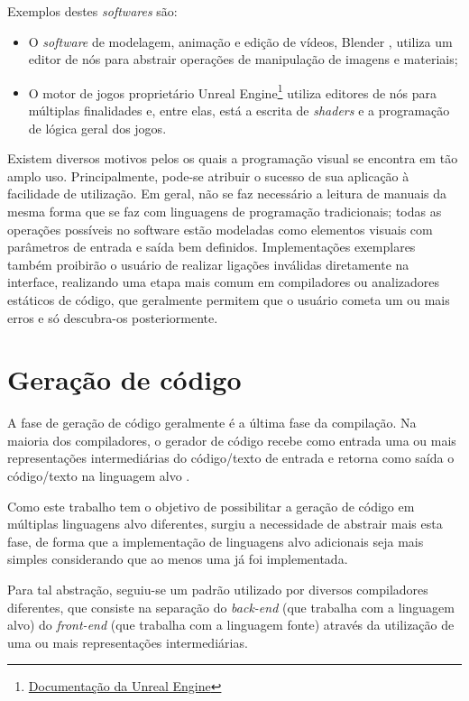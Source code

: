 \documentclass[
	12pt,				%
	openright,			%
	oneside,			%
	a4paper,			%
	main=brazil,
	english,			%
	]{ufsj-abntex2}
\begin{document}
Exemplos destes \textit{softwares} são:

\begin{itemize}
    \item O \textit{software} de modelagem, animação e edição de vídeos, Blender \cite{blender}, utiliza um editor de nós para abstrair operações de manipulação de imagens e materiais;

    \item O motor de jogos proprietário Unreal Engine\footnote{\href{https://www.unrealengine.com/}{Documentação da Unreal Engine}} utiliza editores de nós para múltiplas finalidades e, entre elas, está a escrita de \textit{shaders} e a programação de lógica geral dos jogos.
\end{itemize}

Existem diversos motivos pelos os quais a programação visual se encontra em tão amplo uso. Principalmente, pode-se atribuir o sucesso de sua aplicação à facilidade de utilização. Em geral, não se faz necessário a leitura de manuais da mesma forma que se faz com linguagens de programação tradicionais; todas as operações possíveis no software estão modeladas como elementos visuais com parâmetros de entrada e saída bem definidos. Implementações exemplares também proibirão o usuário de realizar ligações inválidas diretamente na interface, realizando uma etapa mais comum em compiladores ou analizadores estáticos de código, que geralmente permitem que o usuário cometa um ou mais erros e só descubra-os posteriormente.

\section{Geração de código}

A fase de geração de código geralmente é a última fase da compilação. Na maioria dos compiladores, o gerador de código recebe como entrada uma ou mais representações intermediárias do código/texto de entrada e retorna como saída o código/texto na linguagem alvo \cite{dragonBook}. 

Como este trabalho tem o objetivo de possibilitar a geração de código em múltiplas linguagens alvo diferentes, surgiu a necessidade de abstrair mais esta fase, de forma que a implementação de linguagens alvo adicionais seja mais simples considerando que ao menos uma já foi implementada.

Para tal abstração, seguiu-se um padrão utilizado por diversos compiladores diferentes, que consiste na separação do \textit{back-end} (que trabalha com a linguagem alvo) do \textit{front-end} (que trabalha com a linguagem fonte) através da utilização de uma ou mais representações intermediárias. 
\end{document}
